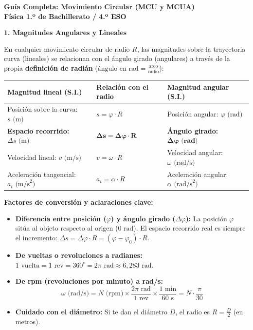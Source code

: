 ﻿\documentclass[11pt,a4paper]{article}
\begin{document}
\pagestyle{empty}

\begin{center}
    {\LARGE \textbf{Guía Completa: Movimiento Circular (MCU y MCUA)}}\\[4pt]
    {\large \textbf{Física 1.º de Bachillerato / 4.º ESO}}
\end{center}

\vspace{0.2cm}
\noindent\textbf{1. Magnitudes Angulares y Lineales}

\noindent En cualquier movimiento circular de radio $R$, las magnitudes sobre la trayectoria curva (lineales) se relacionan con el ángulo girado (angulares) a través de la propia \textbf{definición de radián} ($\text{ángulo en rad} = \frac{\text{arco}}{\text{radio}}$):

\begin{center}
\begin{tabular}{lll}
\toprule
\textbf{Magnitud lineal (S.I.)} & \textbf{Relación con el radio} & \textbf{Magnitud angular (S.I.)} \\
\midrule
Posición sobre la curva: $s\text{ (m)}$ & $s = \varphi \cdot R$ & Posición angular: $\varphi\text{ (rad)}$ \\
\textbf{Espacio recorrido:} $\Delta s\text{ (m)}$ & $\mathbf{\Delta s = \Delta\varphi \cdot R}$ & \textbf{Ángulo girado:} $\mathbf{\Delta\varphi\text{ (rad)}}$ \\
Velocidad lineal: $v\text{ (m/s)}$ & $v = \omega \cdot R$ & Velocidad angular: $\omega\text{ (rad/s)}$ \\
Aceleración tangencial: $a_t\text{ (m/s}^2\text{)}$ & $a_t = \alpha \cdot R$ & Aceleración angular: $\alpha\text{ (rad/s}^2\text{)}$ \\
\bottomrule
\end{tabular}
\end{center}

\vspace{0.1cm}
\begin{tcolorbox}
\textbf{Factores de conversión y aclaraciones clave:}
\begin{itemize}[leftmargin=1.5em, itemsep=2pt]
    \item \textbf{Diferencia entre posición ($\varphi$) y ángulo girado ($\Delta\varphi$):} La posición $\varphi$ sitúa al objeto respecto al origen ($0\text{ rad}$). El espacio recorrido real es siempre el incremento: $\Delta s = \Delta\varphi \cdot R = (\varphi - \varphi_0) \cdot R$.
    \item \textbf{De vueltas o revoluciones a radianes:} $1\text{ vuelta} = 1\text{ rev} = 360^\circ = 2\pi\text{ rad} \approx 6{,}283\text{ rad}$.
    \item \textbf{De rpm (revoluciones por minuto) a rad/s:}
    \[
    \omega\text{ (rad/s)} = N\text{ (rpm)} \times \frac{2\pi\text{ rad}}{1\text{ rev}} \times \frac{1\text{ min}}{60\text{ s}} = N \cdot \frac{\pi}{30}
    \]
    \item \textbf{Cuidado con el diámetro:} Si te dan el diámetro $D$, el radio es $R = \frac{D}{2}$ (en metros).
\end{itemize}
\end{tcolorbox}
\end{document}
